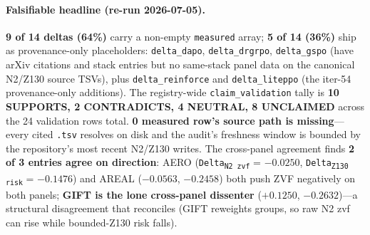 \paragraph{Falsifiable headline (re-run 2026-07-05).}
\textbf{9 of 14 deltas (64\%)} carry a non-empty \texttt{measured}
array; \textbf{5 of 14 (36\%)} ship as provenance-only
placeholders: \texttt{delta\_dapo}, \texttt{delta\_drgrpo},
\texttt{delta\_gspo} (have arXiv citations and stack entries but no
same-stack panel data on the canonical N2/Z130 source TSVs), plus
\texttt{delta\_reinforce} and \texttt{delta\_liteppo} (the iter-54
provenance-only additions). The registry-wide \texttt{claim\_validation}
tally is \textbf{10 SUPPORTS, 2 CONTRADICTS, 4 NEUTRAL, 8 UNCLAIMED}
across the 24 validation rows total. \textbf{0 measured row's source
path is missing}---every cited \texttt{.tsv} resolves on disk and
the audit's freshness window is bounded by the repository's most recent
N2/Z130 writes. The cross-panel agreement finds \textbf{2 of 3 entries
agree on direction}: AERO (\texttt{Delta\textsubscript{N2 zvf}} =
$-0.0250$, \texttt{Delta\textsubscript{Z130 risk}} = $-0.1476$)
and AREAL ($-0.0563$, $-0.2458$) both push ZVF negatively on both
panels; \textbf{GIFT is the lone cross-panel dissenter}
($+0.1250$, $-0.2632$)---a structural disagreement that
 reconciles (GIFT reweights groups, so raw
N2 zvf can rise while bounded-Z130 risk falls).

